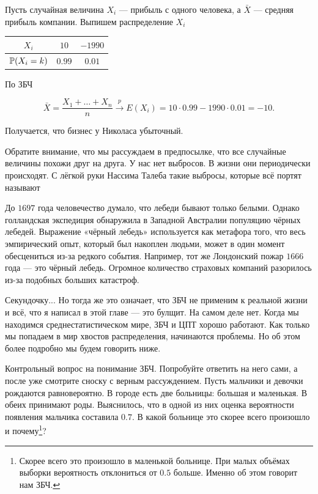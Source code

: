 \documentclass[12pt, a4paper, oneside]{article}
\begin{document}
\begin{sol}
Пусть случайная величина $X_i$ --- прибыль с одного человека, а $\bar X$ --- средняя прибыль компании. Выпишем распределение $X_i$

\begin{center}
    \begin{tabular}{c|c|c}
    $X_i$          & $10$  & $-1990$ \\ \hline 
    $\mathbb{P}(X_i = k)$ & $0.99$ & $0.01$ 
    \end{tabular}
\end{center}

По ЗБЧ 

$$
\bar X = \frac{X_1 + \ldots + X_n}{n} \stackrel{p}{\longrightarrow} E(X_i) = 10 \cdot 0.99 - 1990 ⋅ 0.01 = −10.
$$

Получается, что бизнес у Николаса убыточный. 
\end{sol}

Обратите внимание, что мы рассуждаем в предпосылке, что все случайные величины похожи друг на друга. У нас нет выбросов. В жизни они периодически происходят. С лёгкой руки Нассима Талеба такие выбросы, которые всё портят называют  

До $1697$ года человечество думало, что лебеди бывают только белыми. Однако голландская экспедиция обнаружила в Западной Австралии популяцию чёрных лебедей. Выражение «чёрный лебедь» используется как метафора того, что весь эмпирический опыт, который был накоплен людьми, может в один момент обесцениться из-за редкого события. Например, тот же Лондонский пожар $1666$ года --- это чёрный лебедь. Огромное количество страховых компаний разорилось из-за подобных больших катастроф. 

Секундочку... Но тогда же это означает, что ЗБЧ не применим к реальной жизни и всё, что я написал в этой главе --- это булщит. На самом деле нет. Когда мы находимся среднестатистическом мире,  ЗБЧ и ЦПТ хорошо работают. Как только мы попадаем в мир хвостов распределения,  начинаются проблемы. Но об этом более подробно мы будем говорить ниже. 

Контрольный вопрос на понимание ЗБЧ. Попробуйте ответить на него сами, а после уже смотрите сноску с верным рассуждением. Пусть мальчики и девочки рождаются равновероятно. В городе есть две больницы: большая и маленькая. В обеих принимают роды. Выяснилось, что в одной из них оценка вероятности появления мальчика составила $0.7$. В какой больнице это скорее всего произошло и почему\footnote{Скорее всего это произошло в маленькой больнице. При малых объёмах выборки вероятность отклониться от $0.5$ больше. Именно об этом говорит нам ЗБЧ.}?
\end{document}

